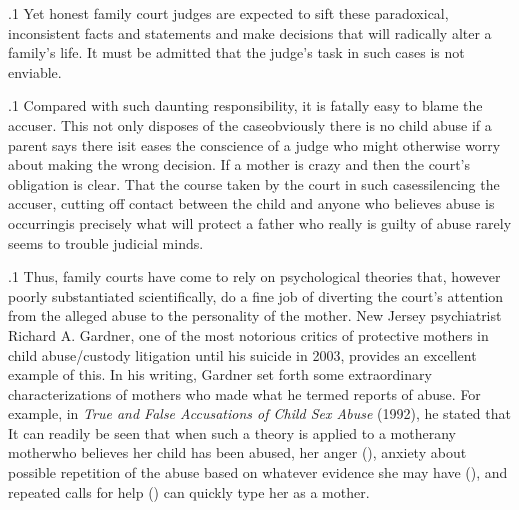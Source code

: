 \documentclass[11pt, twoside]{article}
\begin{document}
{\p.1{%
Yet honest family court judges are expected to sift these paradoxical,
inconsistent facts and statements and make decisions that will radically
alter a family’s life. It must be admitted that the judge’s task in such cases
is not enviable.
}%

\p.1{%
Compared with such daunting responsibility, it is fatally easy to blame
the accuser. This not only disposes of the case\mdash{}obviously there is no
child abuse if a  parent says there is\mdash{}it eases the conscience
of a judge who might otherwise worry about making the wrong decision.
If a mother is crazy and  then the court’s obligation is clear.
That the course taken by the court in such cases\mdash{}silencing the accuser,
cutting off contact between the child and anyone who believes abuse
is occurring\mdash{}is precisely what will protect a father who really is guilty
of abuse rarely seems to trouble judicial minds.
}%

\p.1{%
Thus, family courts have come to rely on psychological theories that,
however poorly substantiated scientifically, do a fine job of diverting
the court’s attention from the alleged abuse to the personality
of the mother. New Jersey psychiatrist Richard A. Gardner, one of the most notorious critics of protective mothers in child abuse/custody litigation until his suicide in 2003,
provides an excellent example of this. In his writing, Gardner set forth
some extraordinary characterizations of mothers who made what he
termed  reports of abuse. For example,
in \textit{True and False Accusations of Child Sex Abuse} (1992), he stated that  It can readily be
seen that when such a theory is applied to a mother\mdash{}any
mother\mdash{}who believes her child has been abused, her anger (), anxiety
about possible repetition of the abuse based on whatever evidence
she may have (), and repeated calls for help
() can quickly type her as a 
mother.
}%

}
\end{document}
